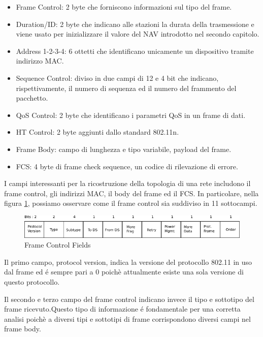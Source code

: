 \begin{itemize}
	\item Frame Control: 2 byte che forniscono informazioni sul tipo del frame.
	\item Duration/ID: 2 byte che indicano alle stazioni la durata della trasmessione e viene usato per inizializzare il valore del NAV introdotto nel secondo capitolo.
	\item Address 1-2-3-4: 6 ottetti che identificano unicamente un dispositivo tramite   indirizzo MAC.
	\item Sequence Control: diviso in due campi di 12 e 4 bit che indicano, rispettivamente, il numero di sequenza ed il numero del frammento del pacchetto.
	\item QoS Control: 2 byte che identificano i parametri QoS in un frame di dati.
	\item HT Control: 2 byte aggiunti dallo standard 802.11n.
	\item Frame Body: campo di lunghezza e tipo variabile, payload del frame.
	\item FCS: 4 byte di frame check sequence, un codice di rilevazione di errore.
\end{itemize}

I campi interessanti per la ricostruzione della topologia di una rete includono il frame control, gli indirizzi MAC, il body del frame ed il FCS.
In particolare, nella figura \ref{fig:framecontrolfields}, possiamo osservare come il frame control sia suddiviso in 11 sottocampi.

\begin{figure}[!htb]
	\centering
	\includegraphics{images/img6.pdf}
	\caption{Frame Control Fields}
	\label{fig:framecontrolfields}
\end{figure}

Il primo campo, protocol version, indica la versione del protocollo 802.11 in uso dal frame ed \'e sempre pari a 0 poich\`e attualmente esiste una sola versione di questo protocollo.

Il secondo e terzo campo del frame control indicano invece il tipo e sottotipo del frame ricevuto.Questo tipo di informazione \'e fondamentale per una corretta analisi poich\`e a diversi tipi e sottotipi di frame corrispondono diversi campi nel frame body.

